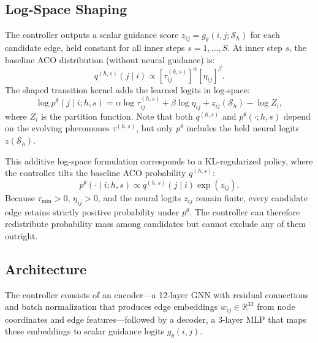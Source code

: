 \documentclass[sigconf,anonymous,review]{acmart}
\theoremstyle{definition}
\theoremstyle{plain}
\begin{document}
\subsection{Log-Space Shaping}
\label{sec:controller}
The controller outputs a scalar guidance score $z_{ij} = g_{\theta}(i, j; \mathcal{S}_h)$ for each candidate edge, held constant for all inner steps $s = 1, \ldots, S$.
At inner step $s$, the baseline ACO distribution (without neural guidance) is:
\begin{equation}
q^{(h,s)}(j \mid i) \propto [\tau^{(h,s)}_{ij}]^\alpha [\eta_{ij}]^\beta.
\label{eq:baseline-aco}
\end{equation}
The shaped transition kernel adds the learned logits in log-space:
\begin{equation}
\log p^\theta(j \mid i; h, s) = \alpha \log \tau^{(h,s)}_{ij} + \beta \log \eta_{ij} + z_{ij}(\mathcal{S}_h) - \log Z_i,
\label{eq:logspace-prior}
\end{equation}
where $Z_i$ is the partition function.
Note that both $q^{(h,s)}$ and $p^\theta(\cdot; h, s)$ depend on the evolving pheromones $\tau^{(h,s)}$, but only $p^\theta$ includes the held neural logits $z(\mathcal{S}_h)$.

This additive log-space formulation corresponds to a KL-regularized policy, where the controller tilts the baseline ACO probability $q^{(h,s)}$:
\begin{equation}
p^\theta(\cdot\mid i; h,s) \propto q^{(h,s)}(j\mid i)\exp(z_{ij}).
\end{equation}
Because $\tau_{\min} > 0$, $\eta_{ij} > 0$, and the neural logits $z_{ij}$ remain finite, every candidate edge retains strictly positive probability under $p^\theta$.
The controller can therefore redistribute probability mass among candidates but cannot exclude any of them outright.

\subsection{Architecture}
\label{sec:architecture}
The controller consists of an encoder---a 12-layer GNN with residual connections and batch normalization that produces edge embeddings $w_{ij} \in \mathbb{R}^{32}$ from node coordinates and edge features---followed by a decoder, a 3-layer MLP that maps these embeddings to scalar guidance logits $g_{\theta}(i, j)$.
\end{document}

